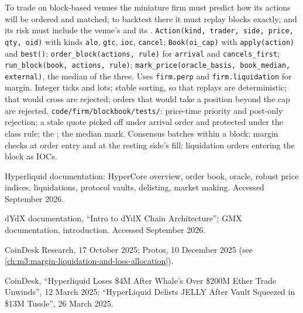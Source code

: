 \begin{build}
 To trade on block-based venues the miniature firm must predict how its actions will be ordered and matched; to backtest there it must replay
blocks exactly; and its risk must include the venue's  and its .
 \texttt{Action(kind, trader, side, price, qty, oid)} with kinds \texttt{alo}, \texttt{gtc}, \texttt{ioc}, \texttt{cancel};
\texttt{Book(oi\_cap)} with \texttt{apply(action)} and \texttt{best()}; \texttt{order\_block(actions, rule)} for \texttt{arrival} and
\texttt{cancels\_first}; \texttt{run\_block(book, actions, rule)}; \texttt{mark\_price(oracle\_basis, book\_median, external)}, the median of the three. Uses \texttt{firm.perp} and
\texttt{firm.liquidation} for margin.
 Integer ticks and lots; stable sorting, so that replays are deterministic;  that would cross are rejected; orders that would take a
position beyond the cap are rejected.
 \texttt{code/firm/blockbook/tests/}: price-time priority and post-only rejection; a stale quote picked off under arrival order and protected under
the class rule; the ; the median mark.
 Consensus batches within a block; margin checks at order entry and at the resting side's fill; liquidation orders entering the block as IOCs.
\end{build}

\begin{omsources}
\item Hyperliquid documentation: HyperCore overview, order book, oracle, robust price indices, liquidations, protocol vaults, delisting, market making.
Accessed September 2026.
\item dYdX documentation, ``Intro to dYdX Chain Architecture''; GMX documentation, introduction. Accessed September 2026.
\item CoinDesk Research, 17 October 2025; Protos, 10 December 2025 (see \cref{ch:m3:margin-liquidation-and-loss-allocation}).
\item CoinDesk, ``Hyperliquid Loses \$4M After Whale's Over \$200M Ether Trade Unwinds'', 12 March 2025; ``HyperLiquid Delists JELLY
After Vault Squeezed in \$13M Tussle'', 26 March 2025.
\end{omsources}

